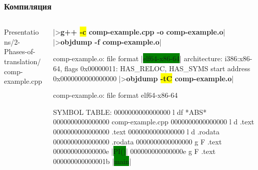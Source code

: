 \documentclass[compress]{beamer}
\newcommand{\shellprompt}{>}
\newcommand{\shellcommand}[1]{\shellprompt \space \textbf{#1}}
\begin{document}
\begin{frame}[fragile]

    \frametitle{Компиляция}

    \begin{columns}[T]

        \begin{column}{0.25\textwidth}

            \CppInputListing
                {Presentations/2-Phases-of-translation/}
                {comp-example.cpp}

        \end{column}

        \begin{column}{0.75\textwidth}

            \begin{ConsoleWindow}
|\shellcommand{g++ \colorbox{yellow}{-c} comp-example.cpp -o comp-example.o}|
|\shellcommand{objdump -f comp-example.o}|

comp-example.o:     file format |\colorbox{green}{elf64-x86-64}|
architecture: i386:x86-64, flags 0x00000011:
HAS_RELOC, HAS_SYMS
start address 0x0000000000000000
|\shellcommand{objdump \colorbox{yellow}{-tC} comp-example.o}|

comp-example.o:     file format elf64-x86-64

SYMBOL TABLE:
0000000000000000 l    df *ABS*  0000000000000000 comp-example.cpp
0000000000000000 l    d  .text  0000000000000000 .text
0000000000000000 l    d  .rodata        0000000000000000 .rodata
0000000000000000 g     F .text  000000000000000e |\colorbox{green}{PI()}|
000000000000000e g     F .text  000000000000001b |\colorbox{green}{main}|
            \end{ConsoleWindow}

        \end{column}

    \end{columns}

\end{frame}
\end{document}
